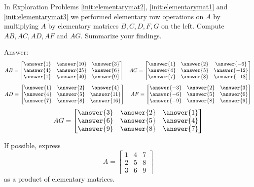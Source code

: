 \documentclass{ximera}
\begin{document}
\begin{problem}In Exploration Problems \ref{init:elementarymat2}, \ref{init:elementarymat1} and \ref{init:elementarymat3} we performed elementary row operations on $A$ by multiplying $A$ by elementary matrices $B, C, D, F, G$ on the left.  Compute $AB, AC, AD, AF$ and $AG$.  Summarize your findings.

Answer:
$$AB=\begin{bmatrix}\answer{1} & \answer{10} & \answer{3} \\ \answer{4} & \answer{25} & \answer{6}\\ \answer{7} & \answer{40} & \answer{9}\end{bmatrix}
\quad
AC=\begin{bmatrix}\answer{1} & \answer{2} & \answer{-6} \\ \answer{4} & \answer{5} & \answer{-12}\\ \answer{7} & \answer{8} & \answer{-18}\end{bmatrix}$$
$$AD=\begin{bmatrix}\answer{1} & \answer{2} & \answer{4} \\ \answer{4} & \answer{5} & \answer{11}\\ \answer{7} & \answer{8} & \answer{16}\end{bmatrix}
\quad
AF=\begin{bmatrix}\answer{-3} & \answer{2} & \answer{3} \\ \answer{-6} & \answer{5} & \answer{6}\\ \answer{-9} & \answer{8} & \answer{9}\end{bmatrix}$$
$$AG=\begin{bmatrix}\answer{3} & \answer{2} & \answer{1} \\ \answer{6} & \answer{5} & \answer{4}\\ \answer{9} & \answer{8} & \answer{7}\end{bmatrix}
$$
\end{problem}


\begin{problem}If possible, express 
$$A=\begin{bmatrix}1&4&7\\2&5&8\\3&6&9\end{bmatrix}$$
as a product of elementary matrices.
\end{problem}
\end{document}
